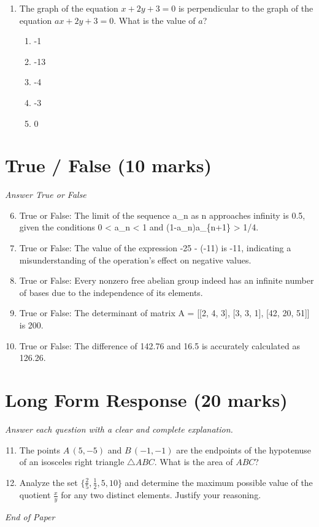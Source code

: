 \documentclass[12pt]{article}
\begin{document}
\begin{enumerate}[label=\arabic*.]
\begin{enumerate}[label=(\alph*)]
    \item \$4.52
    \item \$7.28
    \item \$5.52
    \item \$6.28
    \item \$3.72
\end{enumerate}
\item The graph of the equation $x + 2 y + 3 = 0$ is perpendicular to the graph of the equation $ax + 2 y + 3 = 0$. What is the value of $a$?
\begin{enumerate}[label=(\alph*)]
    \item -1
    \item -13
    \item -4
    \item -3
    \item 0
\end{enumerate}
\end{enumerate}

\section*{True / False (10 marks)}
\textit{Answer True or False}
\begin{enumerate}[label=\arabic*.]
\setcounter{enumi}{5}
\item True or False: The limit of the sequence a\_n as n approaches infinity is 0.5, given the conditions 0 \textless{} a\_n \textless{} 1 and (1-a\_n)a\_\{n+1\} \textgreater{} 1/4.
\item True or False: The value of the expression -25 - (-11) is -11, indicating a misunderstanding of the operation's effect on negative values.
\item True or False: Every nonzero free abelian group indeed has an infinite number of bases due to the independence of its elements.
\item True or False: The determinant of matrix A = [[2, 4, 3], [3, 3, 1], [42, 20, 51]] is 200.
\item True or False: The difference of 142.76 and 16.5 is accurately calculated as 126.26.
\end{enumerate}

\section*{Long Form Response (20 marks)}
\textit{Answer each question with a clear and complete explanation.}
\begin{enumerate}[label=\arabic*.]
\setcounter{enumi}{10}
\item The points $A\, (5,-5)$ and $B\, (-1,-1)$ are the endpoints of the hypotenuse of an isosceles right triangle $\triangle ABC$. What is the area of $ABC$?
\item Analyze the set $\{\frac{2}{5}, \frac{1}{2}, 5, 10\}$ and determine the maximum possible value of the quotient $\frac{x}{y}$ for any two distinct elements. Justify your reasoning.
\end{enumerate}

\vfill
\noindent\textit{End of Paper}
\end{document}
